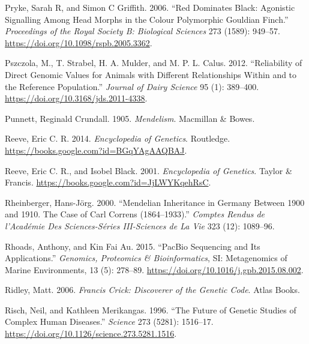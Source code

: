 \documentclass[
]{book}
\newlength{\cslhangindent}
\newlength{\cslentryspacingunit} %
\newenvironment{CSLReferences}[2] %
 {%
  \setlength{\parindent}{0pt}
  \ifodd #1
  \let\oldpar\par
  \def\par{\hangindent=\cslhangindent\oldpar}
  \fi
  \setlength{\parskip}{#2\cslentryspacingunit}
 }%
 {}
\begin{document}
\begin{CSLReferences}{1}{0}
\leavevmode{}%
Pryke, Sarah R, and Simon C Griffith. 2006. {``Red Dominates Black: Agonistic Signalling Among Head Morphs in the Colour Polymorphic {Gouldian} Finch.''} \emph{Proceedings of the Royal Society B: Biological Sciences} 273 (1589): 949--57. \url{https://doi.org/10.1098/rspb.2005.3362}.

\leavevmode{}%
Pszczola, M., T. Strabel, H. A. Mulder, and M. P. L. Calus. 2012. {``Reliability of Direct Genomic Values for Animals with Different Relationships Within and to the Reference Population.''} \emph{Journal of Dairy Science} 95 (1): 389--400. \url{https://doi.org/10.3168/jds.2011-4338}.

\leavevmode{}%
Punnett, Reginald Crundall. 1905. \emph{Mendelism}. {Macmillan \& Bowes}.

\leavevmode{}%
Reeve, Eric C. R. 2014. \emph{Encyclopedia of {Genetics}}. {Routledge}. \url{https://books.google.com?id=BGqYAgAAQBAJ}.

\leavevmode{}%
Reeve, Eric C. R., and Isobel Black. 2001. \emph{Encyclopedia of {Genetics}}. {Taylor \& Francis}. \url{https://books.google.com?id=JjLWYKqehRsC}.

\leavevmode{}%
Rheinberger, Hans-Jörg. 2000. {``Mendelian Inheritance in {Germany} Between 1900 and 1910. {The} Case of {Carl Correns} (1864--1933).''} \emph{Comptes Rendus de l'Académie Des Sciences-Séries III-Sciences de La Vie} 323 (12): 1089--96.

\leavevmode{}%
Rhoads, Anthony, and Kin Fai Au. 2015. {``{PacBio Sequencing} and {Its Applications}.''} \emph{Genomics, Proteomics \& Bioinformatics}, {SI}: {Metagenomics} of {Marine Environments}, 13 (5): 278--89. \url{https://doi.org/10.1016/j.gpb.2015.08.002}.

\leavevmode{}%
Ridley, Matt. 2006. \emph{Francis {Crick}: Discoverer of the Genetic Code}. {Atlas Books}.

\leavevmode{}%
Risch, Neil, and Kathleen Merikangas. 1996. {``The {Future} of {Genetic Studies} of {Complex Human Diseases}.''} \emph{Science} 273 (5281): 1516--17. \url{https://doi.org/10.1126/science.273.5281.1516}.


\end{CSLReferences}
\end{document}
